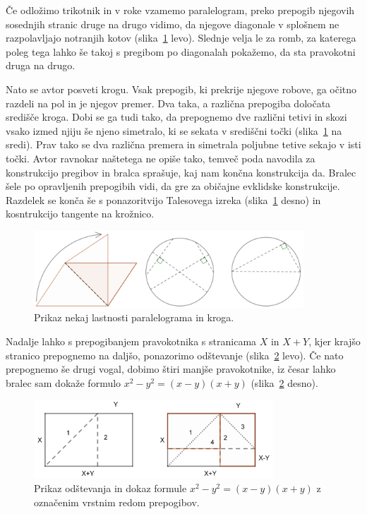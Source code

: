 Če odložimo trikotnik in v roke vzamemo paralelogram, preko prepogib njegovih sosednjih stranic druge na drugo vidimo, da njegove diagonale v splošnem ne razpolavljajo notranjih kotov (slika~\ref{fig:par_krog_vec_lastnosti} levo). Slednje velja le za romb, za katerega poleg tega lahko še takoj s pregibom po diagonalah pokažemo, da sta pravokotni druga na drugo.

Nato se avtor posveti krogu. Vsak prepogib, ki prekrije njegove robove, ga očitno razdeli na pol in je njegov premer. Dva taka, a različna prepogiba določata središče kroga. Dobi se ga tudi tako, da prepognemo dve različni tetivi in skozi vsako izmed njiju še njeno simetralo, ki se sekata v središčni točki (slika~\ref{fig:par_krog_vec_lastnosti} na sredi). Prav tako se dva različna premera in simetrala poljubne tetive sekajo v isti točki. Avtor ravnokar naštetega ne opiše tako, temveč poda navodila za konstrukcijo pregibov in bralca sprašuje, kaj nam končna konstrukcija da. Bralec šele po opravljenih prepogibih vidi, da gre za običajne evklidske konstrukcije. Razdelek se konča še s ponazoritvijo Talesovega izreka (slika~\ref{fig:par_krog_vec_lastnosti} desno) in kosntrukcijo tangente na krožnico.

\begin{figure}[h]
    \centering
    \includegraphics[width=0.9\textwidth]{images/osnovnosolski_prikazi/vec_lastnosti2.png}
    \caption[Pregibi kot dokaz lastnosti paralelograma in kroga]{Prikaz nekaj lastnosti paralelograma in kroga.}
    \label{fig:par_krog_vec_lastnosti}
\end{figure}

Nadalje lahko s prepogibanjem pravokotnika s stranicama $X$ in $X+Y$, kjer krajšo stranico prepognemo na daljšo, ponazorimo odštevanje (slika~\ref{fig:pravok_racunanje} levo). Če nato prepognemo še drugi vogal, dobimo štiri manjše pravokotnike, iz česar lahko bralec sam dokaže formulo $x^2-y^2 = (x-y)(x+y)$ (slika~\ref{fig:pravok_racunanje} desno).

\begin{figure}[h]
    \centering
    \includegraphics[width=0.8\textwidth]{images/osnovnosolski_prikazi/racunanje.png}
    \caption[Pregibi kot računanje]{Prikaz odštevanja in dokaz formule $x^2-y^2 = (x-y)(x+y)$ z označenim vrstnim redom prepogibov.}
    \label{fig:pravok_racunanje}
\end{figure}

